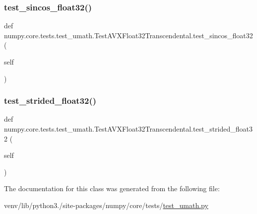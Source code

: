 \subsubsection{\texorpdfstring{test\+\_\+sincos\+\_\+float32()}{test\_sincos\_float32()}}
{\footnotesize\ttfamily def numpy.\+core.\+tests.\+test\+\_\+umath.\+Test\+A\+V\+X\+Float32\+Transcendental.\+test\+\_\+sincos\+\_\+float32 (\begin{DoxyParamCaption}\item[{}]{self }\end{DoxyParamCaption})}

\mbox{\label{classnumpy_1_1core_1_1tests_1_1test__umath_1_1TestAVXFloat32Transcendental_a2698d0b2196c4593d6b495d8ee6b87f3}} 
\subsubsection{\texorpdfstring{test\+\_\+strided\+\_\+float32()}{test\_strided\_float32()}}
{\footnotesize\ttfamily def numpy.\+core.\+tests.\+test\+\_\+umath.\+Test\+A\+V\+X\+Float32\+Transcendental.\+test\+\_\+strided\+\_\+float32 (\begin{DoxyParamCaption}\item[{}]{self }\end{DoxyParamCaption})}



The documentation for this class was generated from the following file\+:\begin{DoxyCompactItemize}
\item 
venv/lib/python3./site-\/packages/numpy/core/tests/\hyperlink{test__umath_8py}{test\+\_\+umath.\+py}\end{DoxyCompactItemize}
